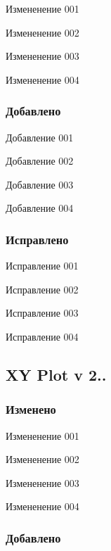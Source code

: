 \begin{DoxyItemize}
\item Измененение 001 \item Измененение 002 \item Измененение 003 \item Измененение 004 \end{DoxyItemize}
\hypertarget{page1_ssubV341Add}{}\subsubsection{Добавлено}\label{page1_ssubV341Add}
\begin{DoxyItemize}
\item Добавление 001 \item Добавление 002 \item Добавление 003 \item Добавление 004 \end{DoxyItemize}
\hypertarget{page1_ssubV341Fixed}{}\subsubsection{Исправлено}\label{page1_ssubV341Fixed}
\begin{DoxyItemize}
\item Исправление 001 \item Исправление 002 \item Исправление 003 \item Исправление 004 \end{DoxyItemize}
\hypertarget{page1_subsecV231}{}\subsection{X\-Y Plot v 2..}\label{page1_subsecV231}
\hypertarget{page1_ssubV231Changes}{}\subsubsection{Изменено}\label{page1_ssubV231Changes}
\begin{DoxyItemize}
\item Измененение 001 \item Измененение 002 \item Измененение 003 \item Измененение 004 \end{DoxyItemize}
\hypertarget{page1_ssubV231Add}{}\subsubsection{Добавлено}\label{page1_ssubV231Add}
